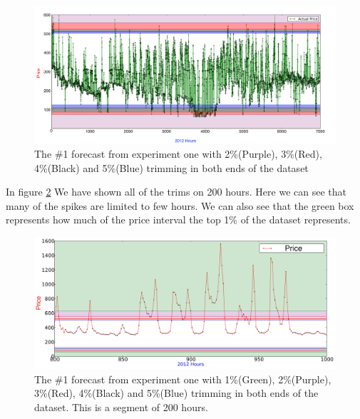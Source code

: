 \begin{figure}[H]
\centering
\includegraphics[width=\linewidth]{billeder/PriceExperimentalAnalysis/restOfTrims.png}
\caption{The \#1 forecast from experiment one with 2\%(Purple), 3\%(Red), 4\%(Black) and 5\%(Blue) trimming in both ends of the dataset}
\label{fig:AllTrims}
\end{figure}

In figure \ref{fig:AllTrims200Hours} We have shown all of the trims on 200 hours. Here we can see that many of the spikes are limited to few hours. We can also see that the green box represents how much of the price interval the top 1\% of the dataset represents.

\begin{figure}[H]
\centering
\includegraphics[width=\linewidth]{billeder/PriceExperimentalAnalysis/200hoursTrimming.jpg}
\caption{The \#1 forecast from experiment one with 1\%(Green), 2\%(Purple), 3\%(Red), 4\%(Black) and 5\%(Blue) trimming in both ends of the dataset. This is a segment of 200 hours.}
\label{fig:AllTrims200Hours}
\end{figure}


